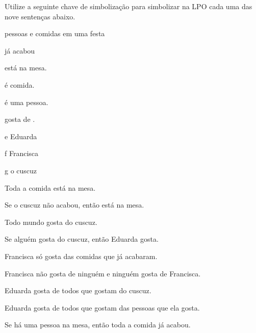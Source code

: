 \problempart
Utilize a seguinte chave de simbolização para simbolizar na LPO cada uma das nove sentenças abaixo.
\begin{center}
\begin{ekey}
\item[\text{domínio}] pessoas e comidas em uma festa
\item[\atom{F}{x}]  já acabou
\item[\atom{M}{x}]  está na mesa.
\item[\atom{C}{x}]  é comida.
\item[\atom{P}{x}]  é uma pessoa.
\item[\atom{G}{x,y}]  gosta de .
\item[e] Eduarda
\item[f] Francisca
\item[g] o cuscuz
\end{ekey}
\end{center}
\begin{earg}
\item Toda a comida está na mesa.
\item Se o cuscuz não acabou, então está na mesa.
\item Todo mundo gosta do cuscuz.
\item Se alguém gosta do cuscuz, então Eduarda gosta.
\item Francisca só gosta das comidas que já acabaram.
\item Francisca não gosta de ninguém e ninguém gosta de Francisca.
\item Eduarda gosta de todos que gostam do cuscuz.
\item Eduarda gosta de todos que gostam das pessoas que ela gosta.
\item Se há uma pessoa na mesa, então toda a comida já acabou.
\end{earg}


